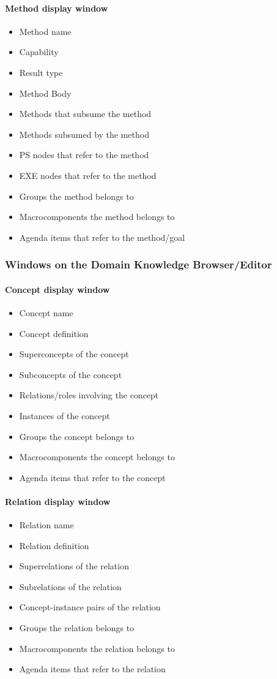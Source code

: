 \documentclass[11pt]{article}
\begin{document}
\paragraph{Method display window}
\begin{itemize}
\item Method name
\item Capability
\item Result type
\item Method Body
\item Methods that subsume the method
\item Methods subsumed by the method
\item PS nodes that refer to the method
\item EXE nodes that refer to the method
\item Groups the method belongs to
\item Macrocomponents the method belongs to
\item Agenda items that refer to the method/goal
\end{itemize}

\subsubsection{Windows on the Domain Knowledge Browser/Editor}

\paragraph{Concept display window}
\begin{itemize}
\item Concept name
\item Concept definition
\item Superconcepts of the concept
\item Subconcepts of the concept
\item Relations/roles involving the concept
\item Instances of the concept
\item Groups the concept belongs to
\item Macrocomponents the concept belongs to
\item Agenda items that refer to the concept
\end{itemize}

\paragraph{Relation display window}
\begin{itemize}
\item Relation name
\item Relation definition
\item Superrelations of the relation
\item Subrelations of the relation
\item Concept-instance pairs of the relation
\item Groups the relation belongs to
\item Macrocomponents the relation belongs to
\item Agenda items that refer to the relation
\end{itemize}
\end{document}
